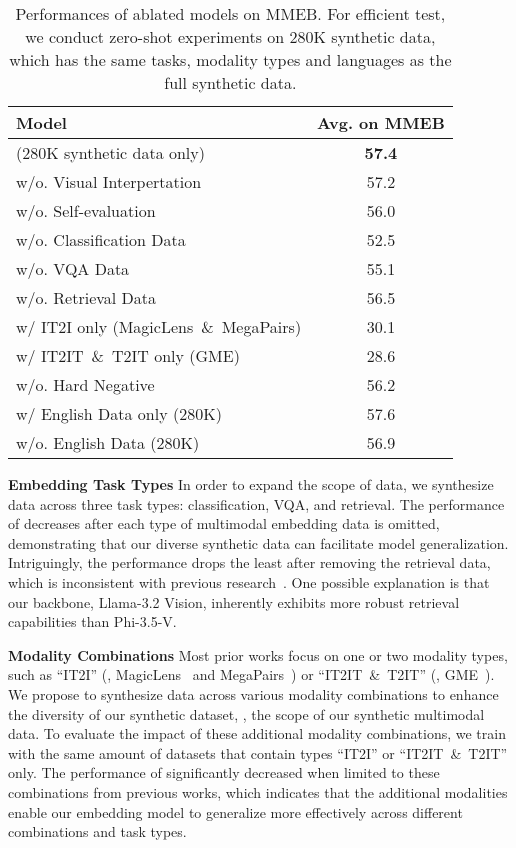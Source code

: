 \begin{table}[!t]
    \centering
    \small
    \renewcommand{\arraystretch}{1.3}
    \begin{tabular}{lc}    
    \toprule
         Model & Avg. on MMEB  \\
        \midrule
        \ours{} (280K synthetic data only) & \textbf{57.4}  \\
        \midrule
        \quad w/o. Visual Interpertation &  57.2  \\
        \quad w/o. Self-evaluation &  56.0  \\
        \hline
        \quad w/o. Classification Data &  52.5  \\
        \quad w/o. VQA Data &  55.1  \\
        \quad w/o. Retrieval Data &  56.5  \\
        \hline
        \quad w/ IT2I only (MagicLens~\&~MegaPairs) & 30.1   \\
        \quad w/  IT2IT~\&~T2IT only (GME) &  28.6  \\
        \hline
        \quad w/o. Hard Negative &  56.2  \\
        \hline
        \quad w/ English Data only (280K) & 57.6 \\
        \quad w/o. English Data (280K) & 56.9 \\
    \bottomrule
    \end{tabular}
    \caption{Performances of ablated models on MMEB.
For efficient test, we conduct zero-shot experiments on 280K synthetic data, which has the same tasks, modality types and languages as the full synthetic data.}
    \label{tab:ablation}
\end{table} 

\noindent \textbf{Embedding Task Types}
In order to expand the scope of data, we synthesize data across three task types: classification, VQA, and retrieval.
The performance of \ours{} decreases after each type of multimodal embedding data is omitted, demonstrating that our diverse synthetic data can facilitate model generalization.
Intriguingly, the performance drops the least after removing the retrieval data, which is inconsistent with previous research~\cite{MMEB}.
One possible explanation is that our backbone, Llama-3.2 Vision, inherently exhibits more robust retrieval capabilities than Phi-3.5-V. 

\noindent \textbf{Modality Combinations}
Most prior works focus on one or two modality types, such as ``IT2I'' (\eg, MagicLens~\cite{MagicLens} and MegaPairs~\cite{megapairs}) or ``IT2IT~\&~T2IT'' (\eg, GME~\cite{GME}).
We propose to synthesize data across various modality combinations to enhance the diversity of our synthetic dataset, \ie, the scope of our synthetic multimodal data.
To evaluate the impact of these additional modality combinations, we train \ours{} with the same amount of datasets that contain types ``IT2I'' or ``IT2IT~\&~T2IT'' only.
The performance of \ours{} significantly decreased when limited to these combinations from previous works, which indicates that the additional modalities enable our embedding model to generalize more effectively across different combinations and task types.



